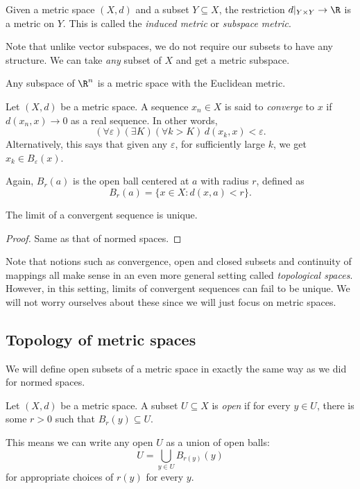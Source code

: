 \documentclass[a4paper]{article}
\begin{document}
\begin{defi}
  Given a metric space $(X, d)$ and a subset $Y\subseteq X$, the restriction $d|_{Y \times Y} \to \R$ is a metric on $Y$. This is called the \emph{induced metric} or \emph{subspace metric}.
\end{defi}
Note that unlike vector subspaces, we do not require our subsets to have any structure. We can take \emph{any} subset of $X$ and get a metric subspace.

\begin{eg}
  Any subspace of $\R^n$ is a metric space with the Euclidean metric.
\end{eg}

\begin{defi}[Convergence]
  Let $(X, d)$ be a metric space. A sequence $x_n \in X$ is said to \emph{converge} to $x$ if $d(x_n, x) \to 0$ as a real sequence. In other words,
  \[
    (\forall \varepsilon)(\exists K)(\forall k > K)\, d(x_k, x) < \varepsilon.
  \]
  Alternatively, this says that given any $\varepsilon$, for sufficiently large $k$, we get $x_k \in B_\varepsilon(x)$.
\end{defi}
Again, $B_r(a)$ is the open ball centered at $a$ with radius $r$, defined as
\[
  B_r(a) = \{x \in X: d(x, a) < r\}.
\]
\begin{prop}
  The limit of a convergent sequence is unique.
\end{prop}

\begin{proof}
  Same as that of normed spaces.
\end{proof}
Note that notions such as convergence, open and closed subsets and continuity of mappings all make sense in an even more general setting called \emph{topological spaces}. However, in this setting, limits of convergent sequences can fail to be unique. We will not worry ourselves about these since we will just focus on metric spaces.

\subsection{Topology of metric spaces}
We will define open subsets of a metric space in exactly the same way as we did for normed spaces.
\begin{defi}
  Let $(X, d)$ be a metric space. A subset $U\subseteq X$ is \emph{open} if for every $y \in U$, there is some $r > 0$ such that $B_r(y) \subseteq U$.
\end{defi}
This means we can write any open $U$ as a union of open balls:
\[
  U = \bigcup_{y \in U} B_{r(y)} (y)
\]
for appropriate choices of $r(y)$ for every $y$.
\end{document}
